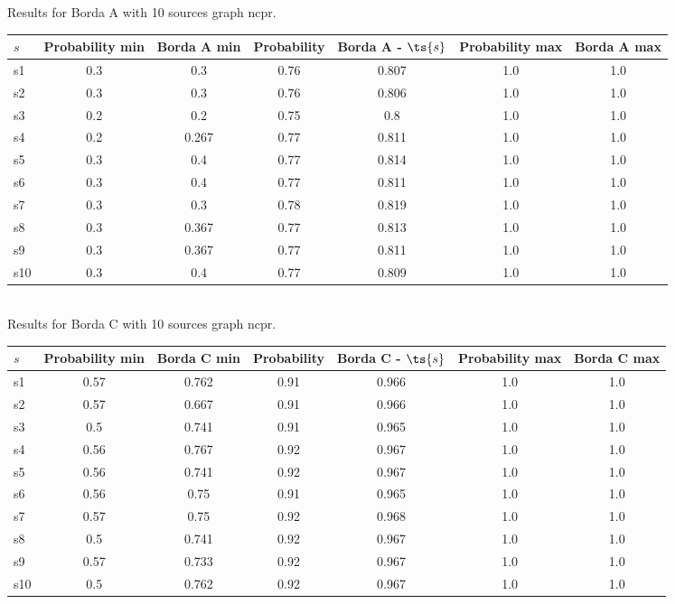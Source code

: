 \documentclass{article}
\begin{document}
\noindent Results for Borda A with 10 sources graph ncpr.

\noindent\begin{tabular}{|l|c|c|c|c|c|c|}
\hline
$s$& Probability min & Borda A min & Probability & Borda A - $\ts{s}$ & Probability max & Borda A max\\
\hline
s1 &0.3 & 0.3 & 0.76 & 0.807 & 1.0 & 1.0\\
\hline
s2 &0.3 & 0.3 & 0.76 & 0.806 & 1.0 & 1.0\\
\hline
s3 &0.2 & 0.2 & 0.75 & 0.8 & 1.0 & 1.0\\
\hline
s4 &0.2 & 0.267 & 0.77 & 0.811 & 1.0 & 1.0\\
\hline
s5 &0.3 & 0.4 & 0.77 & 0.814 & 1.0 & 1.0\\
\hline
s6 &0.3 & 0.4 & 0.77 & 0.811 & 1.0 & 1.0\\
\hline
s7 &0.3 & 0.3 & 0.78 & 0.819 & 1.0 & 1.0\\
\hline
s8 &0.3 & 0.367 & 0.77 & 0.813 & 1.0 & 1.0\\
\hline
s9 &0.3 & 0.367 & 0.77 & 0.811 & 1.0 & 1.0\\
\hline
s10 &0.3 & 0.4 & 0.77 & 0.809 & 1.0 & 1.0\\
\hline
\end{tabular}\\

\noindent Results for Borda C with 10 sources graph ncpr.

\noindent\begin{tabular}{|l|c|c|c|c|c|c|}
\hline
$s$& Probability min & Borda C min & Probability & Borda C - $\ts{s}$ & Probability max & Borda C max\\
\hline
s1 &0.57 & 0.762 & 0.91 & 0.966 & 1.0 & 1.0\\
\hline
s2 &0.57 & 0.667 & 0.91 & 0.966 & 1.0 & 1.0\\
\hline
s3 &0.5 & 0.741 & 0.91 & 0.965 & 1.0 & 1.0\\
\hline
s4 &0.56 & 0.767 & 0.92 & 0.967 & 1.0 & 1.0\\
\hline
s5 &0.56 & 0.741 & 0.92 & 0.967 & 1.0 & 1.0\\
\hline
s6 &0.56 & 0.75 & 0.91 & 0.965 & 1.0 & 1.0\\
\hline
s7 &0.57 & 0.75 & 0.92 & 0.968 & 1.0 & 1.0\\
\hline
s8 &0.5 & 0.741 & 0.92 & 0.967 & 1.0 & 1.0\\
\hline
s9 &0.57 & 0.733 & 0.92 & 0.967 & 1.0 & 1.0\\
\hline
s10 &0.5 & 0.762 & 0.92 & 0.967 & 1.0 & 1.0\\
\hline
\end{tabular}\\
\end{document}
